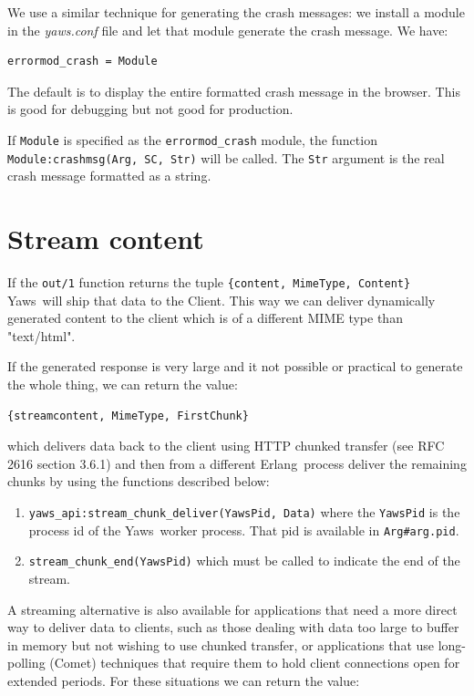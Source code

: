 \documentclass[11pt,oneside,english]{book}
\newcommand{\Erlang}            %
        {{\sc Erlang}}
\newcommand{\Yaws}            %
        {{\sc Yaws}}
\begin{document}
We use a similar technique for generating the crash messages: we
install a module in the \textit{yaws.conf} file and let that module
generate the crash message.  We have:

\begin{verbatim}
errormod_crash = Module
\end{verbatim}

The default is to display the entire formatted crash message in the
browser.  This is good for debugging but not good for production.

If \verb+Module+ is specified as the \verb+errormod_crash+ module, the
function \verb+Module:crashmsg(Arg, SC, Str)+ will be called.  The
\verb+Str+ argument is the real crash message formatted as a string.

\section{Stream content}

If the \verb+out/1+ function returns the tuple
\verb+{content, MimeType, Content}+ \Yaws\ will ship that data to the
Client. This way we can deliver dynamically generated content to the
client which is of a different MIME type than "text/html".

If the generated response is very large and it not possible or
practical to generate the whole thing, we can return the value:

\begin{verbatim}
{streamcontent, MimeType, FirstChunk}
\end{verbatim}

\noindent which delivers data back to the client using HTTP chunked
transfer (see RFC 2616 section 3.6.1) and then from a different
\Erlang\ process deliver the remaining chunks by using the functions
described below:

\begin{enumerate}
\item \verb+yaws_api:stream_chunk_deliver(YawsPid, Data)+ where the
  \verb+YawsPid+ is the process id of the \Yaws\ worker process. That
  pid is available in \verb+Arg#arg.pid+.

\item \verb+stream_chunk_end(YawsPid)+ which must be called to
  indicate the end of the stream.
\end{enumerate}

A streaming alternative is also available for applications that need a
more direct way to deliver data to clients, such as those dealing with
data too large to buffer in memory but not wishing to use chunked
transfer, or applications that use long-polling (Comet) techniques
that require them to hold client connections open for extended
periods. For these situations we can return the value:
\end{document}
